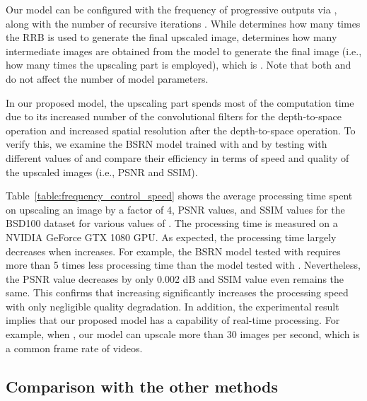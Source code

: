 \documentclass[runningheads]{llncs}
\begin{document}
Our model can be configured with the frequency of progressive outputs via , along with the number of recursive iterations .
While  determines how many times the RRB is used to generate the final upscaled image,  determines how many intermediate images are obtained from the model to generate the final image (i.e., how many times the upscaling part is employed), which is .
Note that both  and  do not affect the number of model parameters.

In our proposed model, the upscaling part spends most of the computation time due to its increased number of the convolutional filters for the depth-to-space operation and increased spatial resolution after the depth-to-space operation.
To verify this, we examine the BSRN model trained with  and  by testing with different values of  and compare their efficiency in terms of speed and quality of the upscaled images (i.e., PSNR and SSIM).

Table~\ref{table:frequency_control_speed} shows the average processing time spent on upscaling an image by a factor of 4, PSNR values, and SSIM values for the BSD100 dataset \cite{martin2001database} for various values of .
The processing time is measured on a NVIDIA GeForce GTX 1080 GPU.
As expected, the processing time largely decreases when  increases.
For example, the BSRN model tested with  requires more than 5 times less processing time than the model tested with .
Nevertheless, the PSNR value decreases by only 0.002 dB and SSIM value even remains the same.
This confirms that increasing  significantly increases the processing speed with only negligible quality degradation.
In addition, the experimental result implies that our proposed model has a capability of real-time processing.
For example, when , our model can upscale more than 30 images per second, which is a common frame rate of videos.


\subsection{Comparison with the other methods}
\label{sec:compare_sota}
\end{document}
